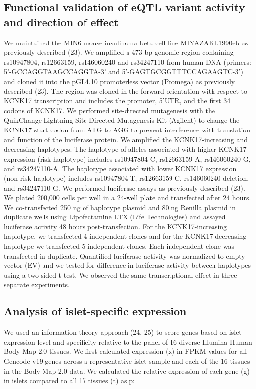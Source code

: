 \subsection{Functional validation of eQTL variant activity and direction of effect}
We maintained the MIN6 mouse insulinoma beta cell line {MIYAZAKI:1990eb} as previously described (23). We amplified a 473-bp genomic region containing rs10947804, rs12663159, rs146060240 and rs34247110 from human DNA (primers: 5’-GCCAGGTAAGCCAGGTA-3’ and 5’-GAGTGCGGTTTCCAGAAGTC-3’) and cloned it into the pGL4.10 promoterless vector (Promega) as previously described (23). The region was cloned in the forward orientation with respect to KCNK17 transcription and includes the promoter, 5’UTR, and the first 34 codons of KCNK17. We performed site-directed mutagenesis with the QuikChange Lightning Site-Directed Mutagenesis Kit (Agilent) to change the KCNK17 start codon from ATG to AGG to prevent interference with translation and function of the luciferase protein. We amplified the KCNK17-increasing and decreasing haplotypes. The haplotype of alleles associated with higher KCNK17 expression (risk haplotype) includes rs10947804-C, rs12663159-A, rs146060240-G, and rs34247110-A. The haplotype associated with lower KCNK17 expression (non-risk haplotype) includes rs10947804-T, rs12663159-C, rs146060240-deletion, and rs34247110-G. We performed luciferase assays as previously described (23). We plated 200,000 cells per well in a 24-well plate and transfected after 24 hours. We co-transfected 250 ng of haplotype plasmid and 80 ng Renilla plasmid in duplicate wells using Lipofectamine LTX (Life Technologies) and assayed luciferase activity 48 hours post-transfection. For the KCNK17-increasing haplotype, we transfected 4 independent clones and for the KCNK17-decreasing haplotype we transfected 5 independent clones. Each independent clone was transfected in duplicate. Quantified luciferase activity was normalized to empty vector (EV) and we tested for difference in luciferase activity between haplotypes using a two-sided t-test. We observed the same transcriptional effect in three separate experiments. 

\subsection{Analysis of islet-specific expression}
We used an information theory approach (24, 25) to score genes based on islet expression level and specificity relative to the panel of 16 diverse Illumina Human Body Map 2.0 tissues. We first calculated expression (x) in FPKM values for all Gencode v19 genes across a representative islet sample and each of the 16 tissues in the Body Map 2.0 data. We calculated the relative expression of each gene (g) in islets compared to all 17 tissues (t) as p:

